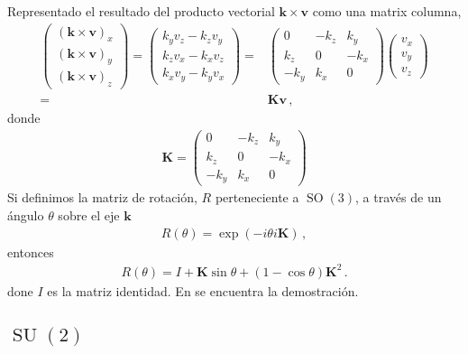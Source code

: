 Representado el resultado del producto vectorial $\boldsymbol{k}\times\boldsymbol{v}$ como una matrix columna,
\begin{align}
  \begin{pmatrix} (\boldsymbol{k}\times\boldsymbol{v})_x \\ (\boldsymbol{k}\times\boldsymbol{v})_y \\ (\boldsymbol{k}\times\boldsymbol{v})_z \end{pmatrix} = \begin{pmatrix} k_y v_z - k_z v_y \\ k_z v_x - k_x v_z \\ k_x v_y - k_y v_x \end{pmatrix} =& \begin{pmatrix} 0 & -k_z & k_y \\ k_z & 0 & -k_x \\ -k_y & k_x & 0 \end{pmatrix} \begin{pmatrix} v_x \\ v_y \\ v_z \end{pmatrix} \nonumber\\
=& \boldsymbol{K} \boldsymbol{v}\,,
\end{align}
donde
\begin{align}
  \boldsymbol{K}=\begin{pmatrix} 0 & -k_z & k_y \\ k_z & 0 & -k_x \\ -k_y & k_x & 0 \end{pmatrix}
\end{align}
Si definimos la matriz de rotación, $R$ perteneciente a $\operatorname{SO}(3)$, a través de un ángulo $\theta$ sobre el eje $\boldsymbol{k}$
\begin{align}
  R(\theta)=\exp \left( - i \theta i \boldsymbol{K} \right)\,,
\end{align}
entonces
\begin{align}
  R(\theta)=I+ \boldsymbol{K} \sin\theta + (1-\cos\theta)\boldsymbol{K}^2\,.
\end{align}
done $I$ es la matriz identidad. En \cite{rodriguez} se encuentra la demostración.



\subsection{$\operatorname{SU}(2)$} 

